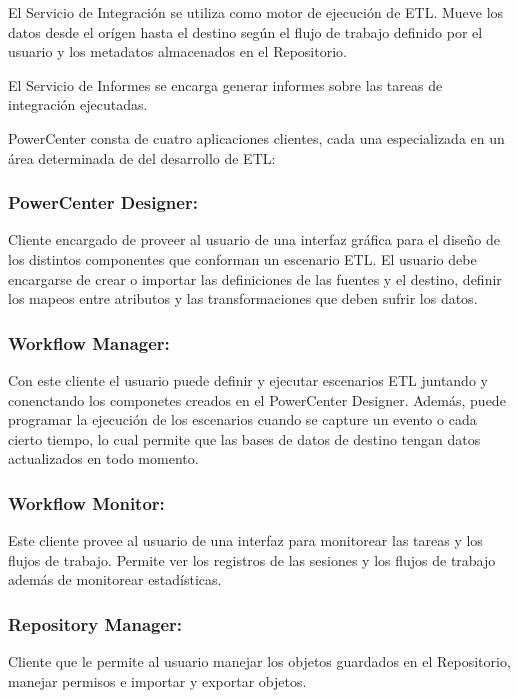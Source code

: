 El Servicio de Integraci\'on se utiliza como motor de ejecución de ETL. Mueve los datos desde el or\'igen hasta el 
destino seg\'un el flujo de trabajo definido por el usuario y los metadatos almacenados en el Repositorio.

El Servicio de Informes se encarga generar informes sobre las tareas de integración ejecutadas.


PowerCenter consta de cuatro aplicaciones clientes, cada una especializada en un \'area determinada de del 
desarrollo de ETL:

\subsubsection{PowerCenter Designer:}

Cliente encargado de proveer al usuario de una interfaz gr\'afica para el diseño de los distintos componentes 
que conforman un escenario ETL. El usuario debe encargarse de crear o importar las definiciones de las fuentes y el 
destino, definir los mapeos entre atributos y las transformaciones que deben sufrir los datos.

\subsubsection{Workflow Manager:}

Con este cliente el usuario puede definir y ejecutar escenarios ETL juntando y conenctando los componetes creados en el 
PowerCenter Designer. Adem\'as, puede programar la ejecución de los escenarios cuando se capture un evento o cada 
cierto tiempo, lo cual permite que las bases de datos de destino tengan datos actualizados en todo momento.

\subsubsection{Workflow Monitor:} 

Este cliente provee al usuario de una interfaz para monitorear las tareas y los flujos de trabajo. Permite ver 
los registros de las sesiones y los flujos de trabajo además de monitorear estad\'isticas.

\subsubsection{Repository Manager:}

Cliente que le permite al usuario manejar los objetos guardados en el Repositorio, manejar permisos e 
importar y exportar objetos.


